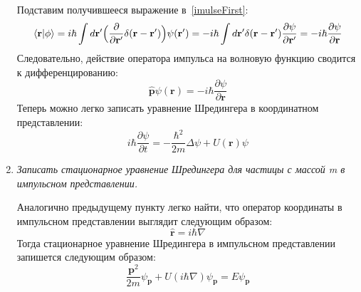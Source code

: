 \documentclass{article}
\begin{document}
\begin{enumerate}
	Подставим получившееся выражение в~\eqref{imulseFirst}:
	\begin{equation}
		\braket{\textbf{r}|\phi} = i\hbar \int d\textbf{r}' \Big(\frac{\partial}{\partial \textbf{r}'} \delta(\textbf{r} - \textbf{r}')\Big) \psi(\textbf{r}') = - i\hbar \int d\textbf{r}' \delta(\textbf{r} - \textbf{r}') \frac{\partial \psi}{\partial \textbf{r}'} = - i\hbar \frac{\partial \psi}{\partial \textbf{r}}
	\end{equation}
	Следовательно, действие оператора импульса на волновую функцию сводится к дифференцированию:
	\begin{equation}
		\hat{\textbf{p}}\psi(\textbf{r}) = -i\hbar \frac{\partial \psi}{\partial \textbf{r}}
	\end{equation}
	Теперь можно легко записать уравнение Шредингера в координатном представлении:
	\begin{equation}
		i\hbar \frac{\partial \psi}{\partial t} = -\frac{\hbar^2}{2m} \Delta \psi + U(\textbf{r})\psi
	\end{equation}
	
	\item \textit{Записать стационарное уравнение Шредингера для частицы с массой m в импульсном представлении.}
	
	Аналогично предыдущему пункту легко найти, что оператор координаты в импульсном представлении выглядит следующим образом:
	\begin{equation}
		\hat{\textbf{r}} = i\hbar \nabla
	\end{equation}
	Тогда стационарное уравнение Шредингера в импульсном представлении запишется следующим образом:
	\begin{equation}
		\frac{\textbf{p}^2}{2m} \psi_\textbf{p} + U(i\hbar\nabla)\psi_\textbf{p} = E \psi_\textbf{p}
	\end{equation}
\end{enumerate}
\end{document}
